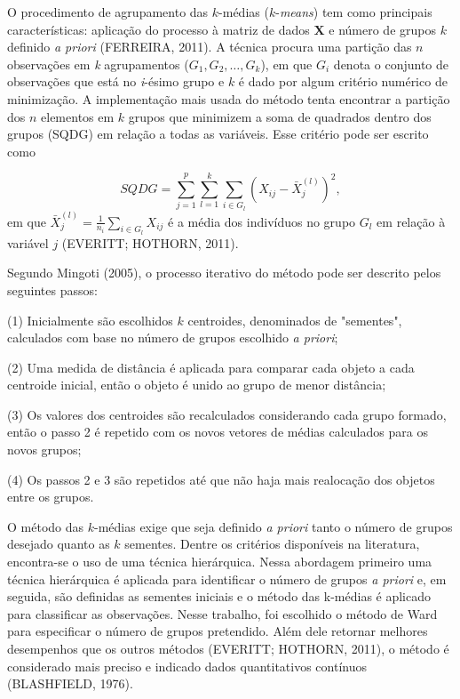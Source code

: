 \documentclass[10pt,twoside]{article}
\begin{document}
O procedimento de agrupamento das $k$-médias ($k$-\textit{means}) tem como principais características: aplicação do processo à matriz de dados $\boldsymbol{X}$ e número de grupos $k$ definido \textit{a priori} (FERREIRA, 2011). A técnica procura uma partição das $n$ observações em \textit{k} agrupamentos ($G_1, G_2,  \dots , G_k$), em que $G_i$ denota o conjunto de observações que está no \textit{i}-ésimo grupo e $k$ é dado por algum critério numérico de minimização. A implementação mais usada do método tenta encontrar a partição dos $n$ elementos em $k$ grupos que minimizem a soma de quadrados dentro dos grupos (SQDG) em relação a todas as variáveis. Esse critério pode ser escrito como

\begin{equation}
SQDG = \sum_{j=1}^{p}\sum_{l=1}^{k}\sum_{i \in G_l}(X_{ij} - \bar{X}_{j}^{(l)})^2,
\end{equation}
em que $\bar{X}_{j}^{(l)} = \displaystyle\frac{1}{n_i}\sum_{i \in G_l}X_{ij}$ é a média dos indivíduos no grupo $G_l$ em relação à variável $j$ (EVERITT; HOTHORN, 2011). %

Segundo Mingoti (2005), o processo iterativo do método pode ser descrito pelos seguintes passos: %

(1) Inicialmente são escolhidos $k$ centroides, denominados de "sementes", calculados com base no número de grupos escolhido \textit{a priori};

(2) Uma medida de distância é aplicada para comparar cada objeto a cada centroide inicial, então o objeto é unido ao grupo de menor distância;

(3) Os valores dos centroides são recalculados considerando cada grupo formado, então o passo 2 é repetido com os novos vetores de médias calculados para os novos grupos;

(4) Os passos 2 e 3 são repetidos até que não haja mais realocação dos objetos entre os grupos. 

O método das $k$-médias exige que seja definido \textit{a priori} tanto o número de grupos desejado quanto as $k$ sementes. Dentre os critérios disponíveis na literatura, encontra-se o uso de uma técnica hierárquica. Nessa abordagem primeiro uma técnica hierárquica é aplicada para identificar o número de grupos \textit{a priori} e, em seguida, são definidas as sementes iniciais e o método das k-médias é aplicado para classificar as observações. Nesse trabalho, foi escolhido o método de Ward para especificar o número de grupos pretendido. Além dele retornar melhores desempenhos que os outros métodos (EVERITT; HOTHORN, 2011), o método é considerado mais preciso e indicado dados quantitativos contínuos (BLASHFIELD, 1976). 
\end{document}
